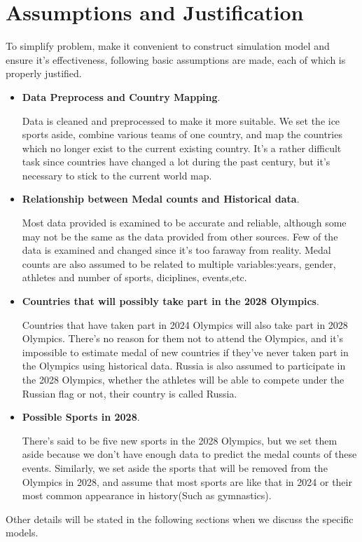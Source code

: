 
\section{Assumptions and Justification}

To simplify problem, make it convenient to construct simulation model and ensure it's effectiveness, following basic assumptions are made, each of which is properly justified.

\begin{itemize}
\item {\bf Data Preprocess and Country Mapping}. 

Data is cleaned and preprocessed to make it more suitable. We set the ice sports aside, combine various teams of one country, and map the countries which no longer exist to the current existing country. It's a rather difficult task since countries have changed a lot during the past century, but it's necessary to stick to the current world map.

\item {\bf Relationship between Medal counts and Historical data}. 

Most data provided is examined to be accurate and reliable, although some may not be the same as the data provided from other sources. Few of the data is examined and changed since it's too faraway from reality. Medal counts are also assumed to be related to multiple variables:years, gender, athletes and number of sports, diciplines, events,etc.

\item {\bf Countries that will possibly take part in the 2028 Olympics}. 

Countries that have taken part in 2024 Olympics will also take part in 2028 Olympics. There's no reason for them not to attend the Olympics, and it's impossible to estimate medal of new countries if they've never taken part in the Olympics using historical data. Russia is also assumed to participate in the 2028 Olympics, whether the athletes will be able to compete under the Russian flag or not, their country is called Russia. 

\item {\bf Possible Sports in 2028}. 

There's said to be five new sports in the 2028 Olympics, but we set them aside because we don't have enough data to predict the medal counts of these events. Similarly, we set aside the sports that will be removed from the Olympics in 2028, and assume that most sports are like that in 2024 or their most common appearance in history(Such as gymnastics).


\end{itemize}

Other details will be stated in the following sections when we discuss the specific models.

